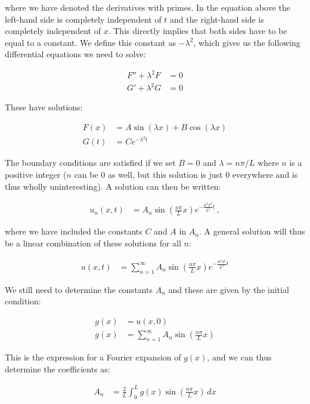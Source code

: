 \documentclass[reprint,english,notitlepage]{revtex4-1}  %
\begin{document}
where we have denoted the derivatives with primes. In the equation above the left-hand side is completely independent of $t$ and the right-hand side is completely independent of $x$. This directly implies that both sides have to be equal to a constant. We define this constant as $-\lambda^2$, which gives us the following differential equations we need to solve:

\begin{align*}
F'' + \lambda^2 F &= 0 \\
G' + \lambda^2 G &= 0
\end{align*}

These have solutions:

\begin{align*}
F(x) &= A \sin (\lambda x) + B \cos ( \lambda x) \\
G(t) &= Ce^{-\lambda^2 t}
\end{align*}

The boundary conditions are satisfied if we set $B = 0$ and $\lambda = n\pi /L$ where $n$ is a positive integer ($n$ can be 0 as well, but this solution is just 0 everywhere and is thus wholly uninteresting). A solution can then be written:

\begin{align*}
u_n(x,t) &= A_n \sin (\frac{n\pi}{L} x ) e^{-\frac{n^2 \pi^2}{L^2} t} \, ,
\end{align*}

where we have included the constants $C$ and $A$ in $A_n$. A general solution will thus be a linear combination of these solutions for all $n$:

\begin{align*}
u(x,t) &= \sum\limits_{n=1}^\infty A_n \sin (\frac{n\pi}{L} x) e^{-\frac{n^2 \pi^2}{L^2} t} 
\end{align*}

We still need to determine the constants $A_n$ and these are given by the initial condition:

\begin{align*}
g(x) &= u(x,0) \\
g(x) &= \sum\limits_{n=1}^\infty A_n \sin ( \frac{n\pi}{L} x) 
\end{align*}

This is the expression for a Fourier expansion of $g(x)$, and we can thus determine the coefficients as:

\begin{align*}
A_n &= \frac{2}{L} \int_0^L g(x) \sin (\frac{n\pi}{L} x) \, dx
\end{align*}
\end{document}
